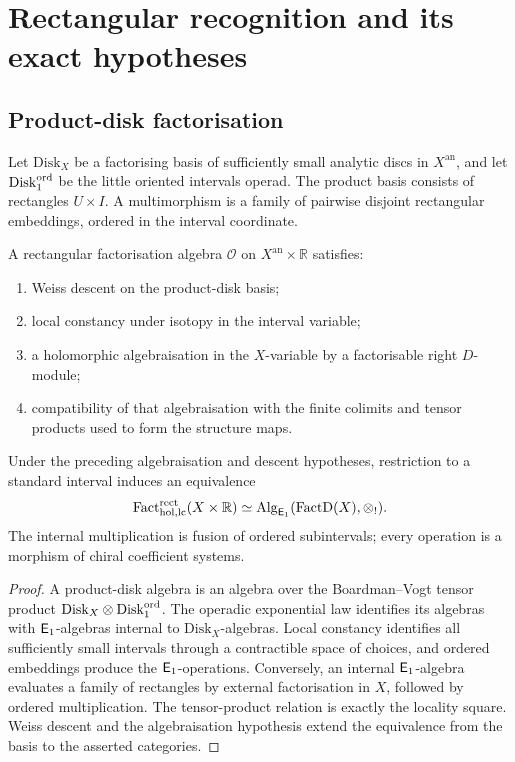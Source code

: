 \chapter{Rectangular recognition and its exact hypotheses}

\section{Product-disk factorisation}
Let \(\mathrm{Disk}_X\) be a factorising basis of sufficiently small analytic discs in \(X^{\mathrm{an}}\), and let \(\mathrm{Disk}^{\mathrm{ord}}_1\) be the little oriented intervals operad.  The product basis consists of rectangles \(U\times I\).  A multimorphism is a family of pairwise disjoint rectangular embeddings, ordered in the interval coordinate.

\begin{definition}
A rectangular factorisation algebra \(\mathcal O\) on \(X^{\mathrm{an}}\times\mathbb R\) satisfies:
\begin{enumerate}
\item Weiss descent on the product-disk basis;
\item local constancy under isotopy in the interval variable;
\item a holomorphic algebraisation in the \(X\)-variable by a factorisable right \(D\)-module;
\item compatibility of that algebraisation with the finite colimits and tensor products used to form the structure maps.
\end{enumerate}
\end{definition}

\begin{recognition}\label{thm:rect-recognition}
Under the preceding algebraisation and descent hypotheses, restriction to a standard interval induces an equivalence
\[
 \operatorname{Fact}_{\mathrm{hol,lc}}^{\mathrm{rect}}(X\times\mathbb R)
 \simeq
 \operatorname{Alg}_{\mathsf E_1}(\operatorname{FactD}(X),\mathbin{\otimes_{!}}).
\]
The internal multiplication is fusion of ordered subintervals; every operation is a morphism of chiral coefficient systems.
\end{recognition}
\begin{proof}
A product-disk algebra is an algebra over the Boardman--Vogt tensor product \(\mathrm{Disk}_X\otimes\mathrm{Disk}^{\mathrm{ord}}_1\).  The operadic exponential law identifies its algebras with \(\mathsf E_1\)-algebras internal to \(\mathrm{Disk}_X\)-algebras.  Local constancy identifies all sufficiently small intervals through a contractible space of choices, and ordered embeddings produce the \(\mathsf E_1\)-operations.  Conversely, an internal \(\mathsf E_1\)-algebra evaluates a family of rectangles by external factorisation in \(X\), followed by ordered multiplication.  The tensor-product relation is exactly the locality square.  Weiss descent and the algebraisation hypothesis extend the equivalence from the basis to the asserted categories.
\end{proof}

